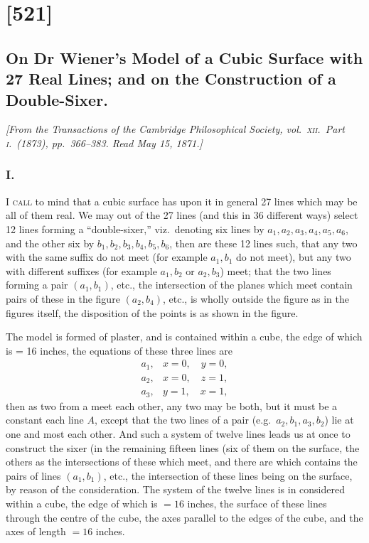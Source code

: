 \documentclass[11pt,a4paper]{book}
\begin{document}
\clearpage

\section{[521]}
\subsection{On Dr Wiener's Model of a Cubic Surface with 27 Real Lines; and on the Construction of a Double-Sixer.}

\begin{center}
\textit{[From the Transactions of the Cambridge Philosophical Society, vol.\ \textsc{xii}.\ Part \textsc{i}.\ (1873), pp.\ 366--383. Read May 15, 1871.]}
\end{center}

\subsubsection*{I.}

\textsc{I call} to mind that a cubic surface has upon it in general 27 lines which may be all of them real. We may out of the 27 lines (and this in 36 different ways) select 12 lines forming a ``double-sixer,'' viz.\ denoting six lines by $a_1, a_2, a_3, a_4, a_5, a_6$, and the other six by $b_1, b_2, b_3, b_4, b_5, b_6$, then are these 12 lines such, that any two with the same suffix do not meet (for example $a_1, b_1$ do not meet), but any two with different suffixes (for example $a_1, b_2$ or $a_2, b_3$) meet; that the two lines forming a pair $(a_1, b_1)$, etc., the intersection of the planes which meet contain pairs of these in the figure $(a_2, b_4)$, etc., is wholly outside the figure as in the figures itself, the disposition of the points is as shown in the figure.

The model is formed of plaster, and is contained within a cube, the edge of which is = 16 inches, the equations of these three lines are
\begin{align*}
a_1, & x = 0, \quad y = 0,\\
a_2, & x = 0, \quad z = 1,\\
a_3, & y = 1, \quad x = 1,
\end{align*}
then as two from a meet each other, any two may be both, but it must be a constant each line $A$, except that the two lines of a pair (e.g.\ $a_2, b_1, a_3, b_2$) lie at one and most each other. And such a system of twelve lines leads us at once to construct the sixer (in the remaining fifteen lines (six of them on the surface, the others as the intersections of these which meet, and there are which contains the pairs of lines $(a_1, b_1)$, etc., the intersection of these lines being on the surface, by reason of the consideration. The system of the twelve lines is in considered within a cube, the edge of which is $= 16$ inches, the surface of these lines through the centre of the cube, the axes parallel to the edges of the cube, and the axes of length $= 16$ inches.
\clearpage
\end{document}
